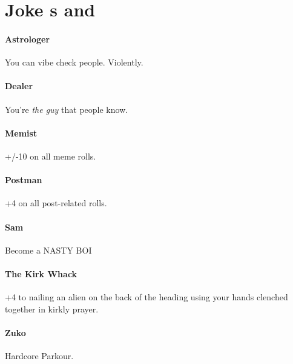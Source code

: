 
\section{Joke \skillC s and \abilityPC}
\hypertarget{joke}{}

\paragraph{Astrologer}
\hypertarget{SkillAstrologer}{}
You can vibe check people. Violently.

\paragraph{Dealer}
\hypertarget{SkillDealer}{}
You're \textit{the guy} that people know.

\paragraph{Memist}
\hypertarget{SkillMemist}{}
+/-10 on all meme rolls.

\paragraph{Postman}
\hypertarget{SkillPostman}{}
+4 on all post-related rolls.

\paragraph{Sam}
\hypertarget{SkillSam}{}
Become a NASTY BOI

\paragraph{The Kirk Whack}
\hypertarget{SkillTheKirkWhack}{}
+4 to nailing an alien on the back of the heading using your hands clenched together in kirkly prayer.

\paragraph{Zuko}
\hypertarget{SkillZuko}{}
Hardcore Parkour.